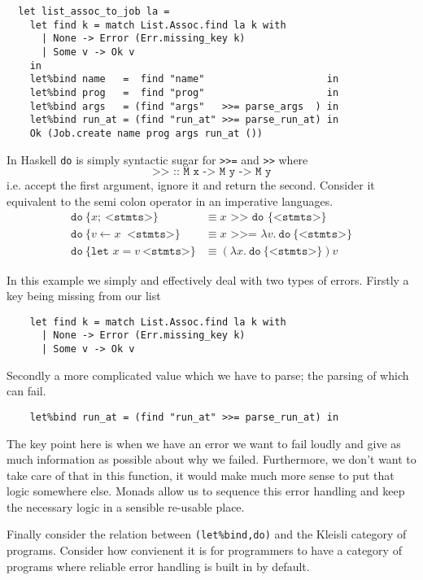 \begin{verbatim}
  let list_assoc_to_job la =
    let find k = match List.Assoc.find la k with
      | None -> Error (Err.missing_key k)
      | Some v -> Ok v
    in
    let%bind name   =  find "name"                     in
    let%bind prog   =  find "prog"                     in
    let%bind args   = (find "args"   >>= parse_args  ) in
    let%bind run_at = (find "run_at" >>= parse_run_at) in
    Ok (Job.create name prog args run_at ())
\end{verbatim}
In Haskell \texttt{do} is simply syntactic sugar for \texttt{>>=} and \texttt{>>} where
\begin{equation}
    \texttt{>> :: M x -> M y -> M y}
\end{equation}
i.e. accept the first argument, ignore it and return the second.
Consider it equivalent to the semi colon operator in an imperative languages.
\begin{align}
    \texttt{do}\ \{ x;\ \texttt{<stmts>} \}
    &\equiv x \texttt{ >> do \{<stmts>\}}
    \\
    \texttt{do}\ \{ v \leftarrow x\ \texttt{ <stmts>}\}
    &\equiv x \texttt{ >>= } \lambda v.\ \texttt{do}\ \{ \texttt{<stmts>} \}
    \\
    \texttt{do}\ \{\texttt{let }x = v\ \texttt{<stmts>}\}
    &\equiv (\lambda x.\ \texttt{do}\ \{ \texttt{<stmts>} \})v
\end{align}

In this example we simply and effectively deal with two types of errors.
Firstly a key being missing from our list
\begin{verbatim}
    let find k = match List.Assoc.find la k with
      | None -> Error (Err.missing_key k)
      | Some v -> Ok v
\end{verbatim}
Secondly a more complicated value which we have to parse;
the parsing of which can fail.
\begin{verbatim}
    let%bind run_at = (find "run_at" >>= parse_run_at) in
\end{verbatim}
The key point here is when we have an error we want to fail
loudly and give as much information as possible about why we failed.
Furthermore, we don't want to take care of that in this function,
it would make much more sense to put that logic somewhere else.
Monads allow us to sequence this error handling
and keep the necessary logic in a sensible re-usable place.

Finally consider the relation between
\texttt{(let\%bind,do)} and the Kleisli category of programs.
Consider how convienent it is for programmers to have a category
of programs where reliable error handling is built in by default.

